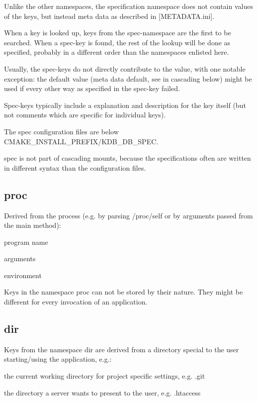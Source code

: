 Unlike the other namespaces, the specification namespace does not contain values of the keys, but instead meta data as described in \mbox{[}M\+E\+T\+A\+D\+A\+T\+A.\+ini\mbox{]}.

When a key is looked up, keys from the spec-\/namespace are the first to be searched. When a spec-\/key is found, the rest of the lookup will be done as specified, probably in a different order than the namespaces enlisted here.

Usually, the spec-\/keys do not directly contribute to the value, with one notable exception\+: the default value (meta data {\ttfamily default}, see in cascading below) might be used if every other way as specified in the spec-\/key failed.

Spec-\/keys typically include a explanation and description for the key itself (but not comments which are specific for individual keys).

The spec configuration files are below C\+M\+A\+K\+E\+\_\+\+I\+N\+S\+T\+A\+L\+L\+\_\+\+P\+R\+E\+F\+I\+X/\+K\+D\+B\+\_\+\+D\+B\+\_\+\+S\+P\+E\+C.

spec is not part of cascading mounts, because the specifications often are written in different syntax than the configuration files.

\subsection*{proc}

Derived from the process (e.\+g. by parsing /proc/self or by arguments passed from the main method)\+:


\begin{DoxyItemize}
\item program name
\item arguments
\item environment
\end{DoxyItemize}

Keys in the namespace proc can not be stored by their nature. They might be different for every invocation of an application.

\subsection*{dir}

Keys from the namespace {\ttfamily dir} are derived from a directory special to the user starting/using the application, e.\+g.\+:


\begin{DoxyItemize}
\item the current working directory for project specific settings, e.\+g. .git
\item the directory a server wants to present to the user, e.\+g. .htaccess
\end{DoxyItemize}

